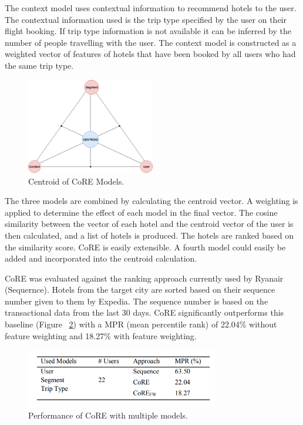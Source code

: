 The context model uses contextual information to recommend hotels to the user. The contextual information used is the trip type specified by the user on their flight booking. If trip type information is not available it can be inferred by the number of people travelling with the user. The context model is constructed as a weighted vector of features of hotels that have been booked by all users who had the same trip type.

\begin{figure}[h!]
\centering
\includegraphics[width=0.5\textwidth]{design_and_methodology/centroid.png}
\caption{\label{fig:centroid} Centroid of CoRE Models.}
\end{figure}

The three models are combined by calculating the centroid vector. A weighting is applied to determine the effect of each model in the final vector. The cosine similarity between the vector of each hotel and the centroid vector of the user is then calculated, and a list of hotels is produced. The hotels are ranked based on the similarity score. CoRE is easily extensible. A fourth model could easily be added and incorporated into the centroid calculation.

CoRE was evaluated against the ranking approach currently used by Ryanair (Sequernce). Hotels from the target city are sorted based on their sequence number given to them by Expedia. The sequence number is based on the transactional data from the last 30 days. CoRE significantly outperforms this baseline (Figure ~\ref{fig:coreperform}) with a MPR (mean percentile rank) of 22.04\% without feature weighting and 18.27\% with feature weighting.

\begin{figure}[h!]
\centering
\includegraphics[width=0.75\textwidth]{design_and_methodology/core_results.PNG}
\caption{\label{fig:coreperform} Performance of CoRE with multiple models.}
\end{figure}

